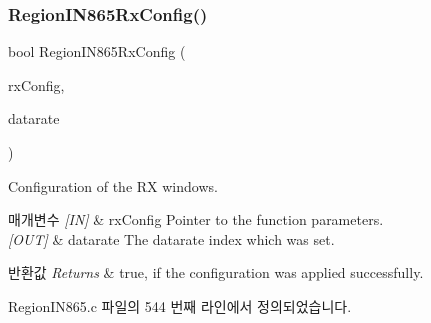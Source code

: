 \subsubsection{\texorpdfstring{Region\+I\+N865\+Rx\+Config()}{RegionIN865RxConfig()}}
{\footnotesize\ttfamily bool Region\+I\+N865\+Rx\+Config (\begin{DoxyParamCaption}\item[{\mbox{\hyperlink{group___r_e_g_i_o_n_ga375c038078dfcfc7ef14280021db719e}{Rx\+Config\+Params\+\_\+t}} $\ast$}]{rx\+Config,  }\item[{int8\+\_\+t $\ast$}]{datarate }\end{DoxyParamCaption})}



Configuration of the RX windows. 


\begin{DoxyParams}{매개변수}
{\em \mbox{[}\+I\+N\mbox{]}} & rx\+Config Pointer to the function parameters.\\
\hline
{\em \mbox{[}\+O\+U\+T\mbox{]}} & datarate The datarate index which was set.\\
\hline
\end{DoxyParams}

\begin{DoxyRetVals}{반환값}
{\em Returns} & true, if the configuration was applied successfully. \\
\hline
\end{DoxyRetVals}


Region\+I\+N865.\+c 파일의 544 번째 라인에서 정의되었습니다.


